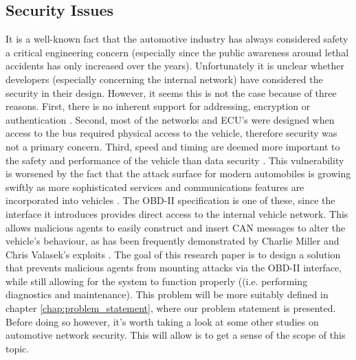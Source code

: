 \subsection{Security Issues}
\label{subsec:obd:security_issues}

It is a well-known fact that the automotive industry has always considered safety a critical engineering concern (especially since the public awareness around lethal accidents has only increased over the years). Unfortunately it is unclear whether developers (especially concerning the internal network) have considered the security in their design. However, it seems this is not the case because of three reasons. First, there is no inherent support for addressing, encryption or authentication \cite{MillerB}. Second, most of the networks and ECU's were designed when access to the bus required physical access to the vehicle, therefore security was not a primary concern. Third, speed and timing are deemed more important to the safety and performance of the vehicle than data security \cite{Klinedinst05}. This vulnerability is worsened by the fact that the attack surface for modern automobiles is growing swiftly as more sophisticated services and communications features are incorporated into vehicles \cite{Kosher}. The OBD-II specification is one of these, since the interface it introduces provides direct access to the internal vehicle network. This allows malicious agents to easily construct and insert CAN messages to alter the vehicle's behaviour, as has been frequently demonstrated by Charlie Miller and Chris Valasek's exploits \cite{MillerA, MillerB, MillerC}. The goal of this research paper is to design a solution that prevents malicious agents from mounting attacks via the OBD-II interface, while still allowing for the system to function properly ((i.e. performing diagnostics and maintenance). This problem will be more suitably defined in chapter \ref{chap:problem_statement}, where our problem statement is presented. Before doing so however, it's worth taking a look at some other studies on automotive network security. This will allow is to get a sense of the scope of this topic.

